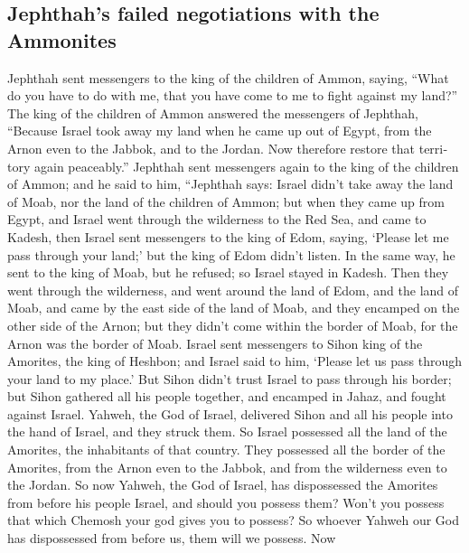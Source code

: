\begin{paracol}{2}
\begin{otherlanguage}{english}
{\subsection{Jephthah's failed negotiations with the
Ammonites}\label{jephthahs-failed-negotiations-with-the-ammonites}}

 Jephthah sent messengers to the king of the children of
Ammon, saying, ``What do you have to do with me, that you have come to
me to fight against my land?''  The king of the children
of Ammon answered the messengers of Jephthah, ``Because Israel took away
my land when he came up out of Egypt, from the Arnon even to the Jabbok,
and to the Jordan. Now therefore restore that territory again
peaceably.''  Jephthah sent messengers again to the king
of the children of Ammon;  and he said to him, ``Jephthah
says: Israel didn't take away the land of Moab, nor the land of the
children of Ammon;  but when they came up from Egypt, and
Israel went through the wilderness to the Red Sea, and came to Kadesh,
 then Israel sent messengers to the king of Edom, saying,
`Please let me pass through your land;' but the king of Edom didn't
listen. In the same way, he sent to the king of Moab, but he refused; so
Israel stayed in Kadesh.  Then they went through the
wilderness, and went around the land of Edom, and the land of Moab, and
came by the east side of the land of Moab, and they encamped on the
other side of the Arnon; but they didn't come within the border of Moab,
for the Arnon was the border of Moab.  Israel sent
messengers to Sihon king of the Amorites, the king of Heshbon; and
Israel said to him, `Please let us pass through your land to my place.'
 But Sihon didn't trust Israel to pass through his
border; but Sihon gathered all his people together, and encamped in
Jahaz, and fought against Israel.  Yahweh, the God of
Israel, delivered Sihon and all his people into the hand of Israel, and
they struck them. So Israel possessed all the land of the Amorites, the
inhabitants of that country.  They possessed all the
border of the Amorites, from the Arnon even to the Jabbok, and from the
wilderness even to the Jordan.  So now Yahweh, the God of
Israel, has dispossessed the Amorites from before his people Israel, and
should you possess them?  Won't you possess that which
Chemosh your god gives you to possess? So whoever Yahweh our God has
dispossessed from before us, them will we possess.  Now

\end{otherlanguage}
\end{paracol}
